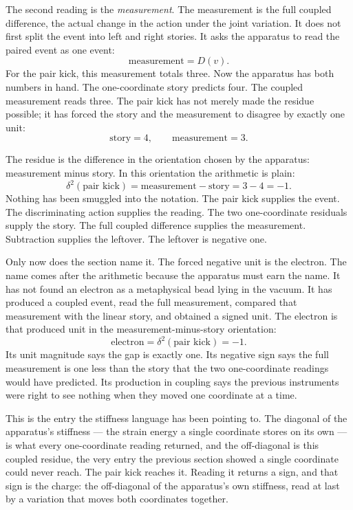 The second reading is the \emph{measurement}. The measurement is the full
coupled difference, the actual change in the action under the joint variation.
It does not first split the event into left and right stories. It asks the
apparatus to read the paired event as one event:
\[
  \text{measurement} = D(v).
\]
For the pair kick, this measurement totals three. Now the apparatus has both
numbers in hand. The one-coordinate story predicts four. The coupled
measurement reads three. The pair kick has not merely made the residue
possible; it has forced the story and the measurement to disagree by exactly
one unit:
\[
  \text{story} = 4,
  \qquad
  \text{measurement} = 3.
\]

The residue is the difference in the orientation chosen by the apparatus:
measurement minus story. In this orientation the arithmetic is plain:
\[
  \delta^2(\text{pair kick})
    = \text{measurement} - \text{story}
    = 3 - 4
    = -1.
\]
Nothing has been smuggled into the notation. The pair kick supplies the event.
The discriminating action supplies the reading. The two one-coordinate
residuals supply the story. The full coupled difference supplies the
measurement. Subtraction supplies the leftover. The leftover is negative one.

Only now does the section name it. The forced negative unit is the electron.
The name comes after the arithmetic because the apparatus must earn the name.
It has not found an electron as a metaphysical bead lying in the vacuum. It has
produced a coupled event, read the full measurement, compared that measurement
with the linear story, and obtained a signed unit. The electron is that
produced unit in the measurement-minus-story orientation:
\[
  \text{electron}
    = \delta^2(\text{pair kick})
    = -1.
\]
Its unit magnitude says the gap is exactly one. Its negative sign says the full
measurement is one less than the story that the two one-coordinate readings
would have predicted. Its production in coupling says the previous instruments
were right to see nothing when they moved one coordinate at a time.

This is the entry the stiffness language has been pointing to. The diagonal of
the apparatus's stiffness --- the strain energy a single coordinate stores on its
own --- is what every one-coordinate reading returned, and the off-diagonal is
this coupled residue, the very entry the previous section showed a single
coordinate could never reach. The pair kick reaches it. Reading it returns a
sign, and that sign is the charge: the off-diagonal of the apparatus's own
stiffness, read at last by a variation that moves both coordinates together.

